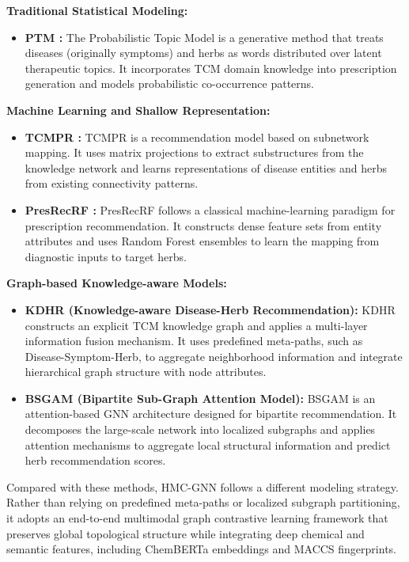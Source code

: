 \documentclass[a4paper,fleqn]{cas-dc}
\begin{document}
\textbf{Traditional Statistical Modeling:}
\begin{itemize}
    \item \textbf{PTM \cite{ref23}:} The Probabilistic Topic Model is a generative method that treats diseases (originally symptoms) and herbs as words distributed over latent therapeutic topics. It incorporates TCM domain knowledge into prescription generation and models probabilistic co-occurrence patterns.
\end{itemize}

\textbf{Machine Learning and Shallow Representation:}
\begin{itemize}
    \item \textbf{TCMPR \cite{ref54}:} TCMPR is a recommendation model based on subnetwork mapping. It uses matrix projections to extract substructures from the knowledge network and learns representations of disease entities and herbs from existing connectivity patterns.
    \item \textbf{PresRecRF \cite{ref28}:} PresRecRF follows a classical machine-learning paradigm for prescription recommendation. It constructs dense feature sets from entity attributes and uses Random Forest ensembles to learn the mapping from diagnostic inputs to target herbs.
\end{itemize}

\textbf{Graph-based Knowledge-aware Models:}
\begin{itemize}
    \item \textbf{KDHR \cite{ref38} (Knowledge-aware Disease-Herb Recommendation):} KDHR constructs an explicit TCM knowledge graph and applies a multi-layer information fusion mechanism. It uses predefined meta-paths, such as Disease-Symptom-Herb, to aggregate neighborhood information and integrate hierarchical graph structure with node attributes.
    \item \textbf{BSGAM \cite{ref55} (Bipartite Sub-Graph Attention Model):} BSGAM is an attention-based GNN architecture designed for bipartite recommendation. It decomposes the large-scale network into localized subgraphs and applies attention mechanisms to aggregate local structural information and predict herb recommendation scores.
\end{itemize}

Compared with these methods, HMC-GNN follows a different modeling strategy. Rather than relying on predefined meta-paths or localized subgraph partitioning, it adopts an end-to-end multimodal graph contrastive learning framework that preserves global topological structure while integrating deep chemical and semantic features, including ChemBERTa embeddings and MACCS fingerprints.
\end{document}
